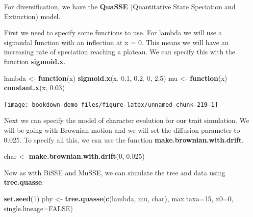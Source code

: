 \documentclass[
]{book}
\newenvironment{Shaded}{\begin{snugshade}}{\end{snugshade}}
\newcommand{\ControlFlowTok}[1]{\textcolor[rgb]{0.13,0.29,0.53}{\textbf{#1}}}
\newcommand{\DataTypeTok}[1]{\textcolor[rgb]{0.13,0.29,0.53}{#1}}
\newcommand{\DecValTok}[1]{\textcolor[rgb]{0.00,0.00,0.81}{#1}}
\newcommand{\FloatTok}[1]{\textcolor[rgb]{0.00,0.00,0.81}{#1}}
\newcommand{\KeywordTok}[1]{\textcolor[rgb]{0.13,0.29,0.53}{\textbf{#1}}}
\newcommand{\NormalTok}[1]{#1}
\newcommand{\OtherTok}[1]{\textcolor[rgb]{0.56,0.35,0.01}{#1}}
\newcommand{\StringTok}[1]{\textcolor[rgb]{0.31,0.60,0.02}{#1}}
\begin{document}
For diversification, we have the \textbf{QuaSSE} (Quantitative State Speciation and Extinction) model.

First we need to specify some functions to use. For lambda we will use a sigmoidal function with an inflection at x = 0. This means we will have an increasing rate of speciation reaching a plateau. We can specify this with the function \textbf{sigmoid.x}.

\begin{Shaded}
\begin{Highlighting}[]
\NormalTok{lambda \textless{}{-}}\StringTok{ }\ControlFlowTok{function}\NormalTok{(x) }\KeywordTok{sigmoid.x}\NormalTok{(x, }\FloatTok{0.1}\NormalTok{, }\FloatTok{0.2}\NormalTok{, }\DecValTok{0}\NormalTok{, }\FloatTok{2.5}\NormalTok{)}
\NormalTok{mu \textless{}{-}}\StringTok{ }\ControlFlowTok{function}\NormalTok{(x) }\KeywordTok{constant.x}\NormalTok{(x, }\FloatTok{0.03}\NormalTok{)}
\end{Highlighting}
\end{Shaded}

\begin{center}\texttt{[image: bookdown-demo\_files/figure-latex/unnamed-chunk-219-1]} \end{center}

Next we can specify the model of character evolution for our trait simulation. We will be going with Brownian motion and we will set the diffusion parameter to 0.025. To specify all this, we can use the function \textbf{make.brownian.with.drift}.

\begin{Shaded}
\begin{Highlighting}[]
\NormalTok{char \textless{}{-}}\StringTok{ }\KeywordTok{make.brownian.with.drift}\NormalTok{(}\DecValTok{0}\NormalTok{, }\FloatTok{0.025}\NormalTok{)}
\end{Highlighting}
\end{Shaded}

Now as with BiSSE and MuSSE, we can simulate the tree and data using \textbf{tree.quasse}.

\begin{Shaded}
\begin{Highlighting}[]
\KeywordTok{set.seed}\NormalTok{(}\DecValTok{1}\NormalTok{)}
\NormalTok{phy \textless{}{-}}\StringTok{ }\KeywordTok{tree.quasse}\NormalTok{(}\KeywordTok{c}\NormalTok{(lambda, mu, char), }\DataTypeTok{max.taxa=}\DecValTok{15}\NormalTok{, }\DataTypeTok{x0=}\DecValTok{0}\NormalTok{, }\DataTypeTok{single.lineage=}\OtherTok{FALSE}\NormalTok{)}
\end{Highlighting}
\end{Shaded}
\end{document}

